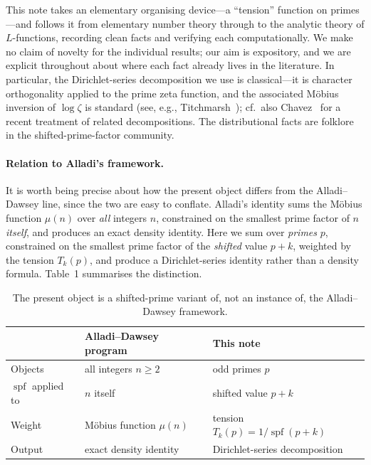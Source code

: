 \documentclass[11pt]{article}
\theoremstyle{plain}
\theoremstyle{definition}
\theoremstyle{remark}
\newcommand{\spf}{\operatorname{spf}}
\begin{document}
This note takes an elementary organising device---a ``tension'' function on
primes---and follows it from elementary number theory through to the analytic
theory of $L$-functions, recording clean facts and verifying each computationally.
We make no claim of novelty for the individual results; our aim is expository,
and we are explicit throughout about where each fact already lives in the
literature. In particular, the Dirichlet-series decomposition we use is
classical---it is character orthogonality applied to the prime zeta function,
and the associated M\"obius inversion of $\log\zeta$ is standard (see, e.g.,
Titchmarsh~\cite{Titchmarsh}); cf.\ also Chavez~\cite{Chavez2023} for a recent
treatment of related decompositions. The distributional facts are folklore in
the shifted-prime-factor community.

\paragraph{Relation to Alladi's framework.}
It is worth being precise about how the present object differs from the
Alladi--Dawsey line, since the two are easy to conflate. Alladi's identity sums
the M\"obius function $\mu(n)$ over \emph{all} integers $n$, constrained on the
smallest prime factor of $n$ \emph{itself}, and produces an exact density
identity. Here we sum over \emph{primes} $p$, constrained on the smallest prime
factor of the \emph{shifted} value $p+k$, weighted by the tension $T_k(p)$, and
produce a Dirichlet-series identity rather than a density formula. Table~1
summarises the distinction.

\begin{table}[h]
\centering
\renewcommand{\arraystretch}{1.3}
\begin{tabular}{@{}lll@{}}
\toprule
 & Alladi--Dawsey program & This note \\
\midrule
Objects & all integers $n\ge 2$ & odd primes $p$ \\
$\spf$ applied to & $n$ itself & shifted value $p+k$ \\
Weight & M\"obius function $\mu(n)$ & tension $T_k(p)=1/\spf(p+k)$ \\
Output & exact density identity & Dirichlet-series decomposition \\
\bottomrule
\end{tabular}
\caption{The present object is a shifted-prime variant of, not an instance of,
the Alladi--Dawsey framework.}
\end{table}
\end{document}

